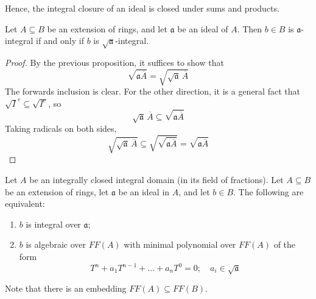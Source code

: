 Hence, the integral closure of an ideal is closed under sums and products.
\begin{corollary}
    Let \( A \subseteq B \) be an extension of rings, and let \( \mathfrak a \) be an ideal of \( A \).
    Then \( b \in B \) is \( \mathfrak a \)-integral if and only if \( b \) is \( \sqrt{\mathfrak a} \)-integral.
\end{corollary}
\begin{proof}
    By the previous proposition, it suffices to show that
    \[ \sqrt{\mathfrak a \overline A} = \sqrt{\sqrt{\mathfrak a}\, \overline A} \]
    The forwards inclusion is clear.
    For the other direction, it is a general fact that \( \sqrt{I}^e \subseteq \sqrt{I^e} \), so
    \[ \sqrt{\mathfrak a}\, \overline A \subseteq \sqrt{\mathfrak a \overline A} \]
    Taking radicals on both sides,
    \[ \sqrt{\sqrt{\mathfrak a}\, \overline A} \subseteq \sqrt{\sqrt{\mathfrak a \overline A}} = \sqrt{\mathfrak a \overline A} \]
\end{proof}
\begin{proposition}
    Let \( A \) be an integrally closed integral domain (in its field of fractions).
    Let \( A \subseteq B \) be an extension of rings, let \( \mathfrak a \) be an ideal in \( A \), and let \( b \in B \).
    The following are equivalent:
    \begin{enumerate}
        \item \( b \) is integral over \( \mathfrak a \);
        \item \( b \) is algebraic over \( FF(A) \) with minimal polynomial over \( FF(A) \) of the form
        \[ T^n + a_1 T^{n-1} + \dots + a_n T^0 = 0;\quad a_i \in \sqrt{\mathfrak a} \]
    \end{enumerate}
\end{proposition}
Note that there is an embedding \( FF(A) \subseteq FF(B) \).
